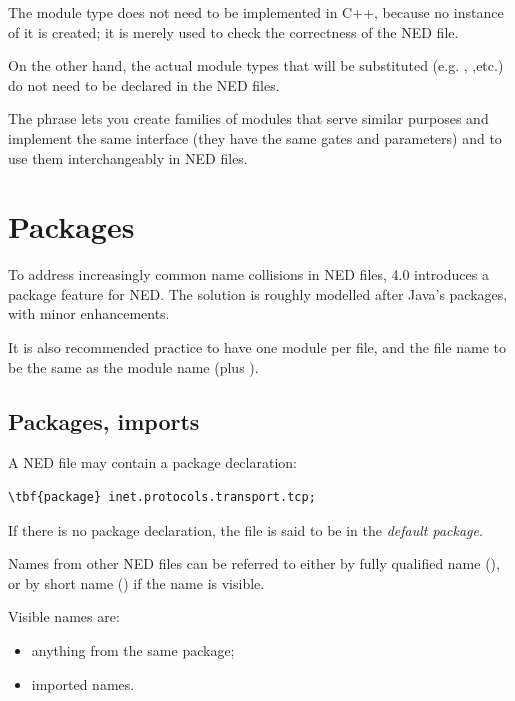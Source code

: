 The  module type does not need to be implemented in
C++, because no instance of it is created; it is merely used
to check the correctness of the NED file.

On the other hand, the actual module types that will be substituted
(e.g. , ,etc.)
do not need to be declared in the NED files.

The  phrase lets you create families
of modules that serve similar purposes and implement the same interface
(they have the same gates and parameters)
and to use them interchangeably in NED files.



\section{Packages}

To address increasingly common name collisions in NED files,
{\opp} 4.0 introduces a package feature for NED. The solution
is roughly modelled after Java's packages, with minor enhancements.

It is also recommended practice to have one module per file,
and the file name to be the same as the module name (plus ).

\subsection{Packages, imports}

A NED file may contain a package declaration:

\begin{Verbatim}[commandchars=\\\{\}]
\tbf{package} inet.protocols.transport.tcp;
\end{Verbatim}

If there is no package declaration, the file is said to be in the
\textit{default package}.

Names from other NED files can be referred to either by fully qualified
name (), or by short name
() if the name is visible.

Visible names are:
\begin{itemize}
  \item anything from the same package;
  \item imported names.
\end{itemize}

